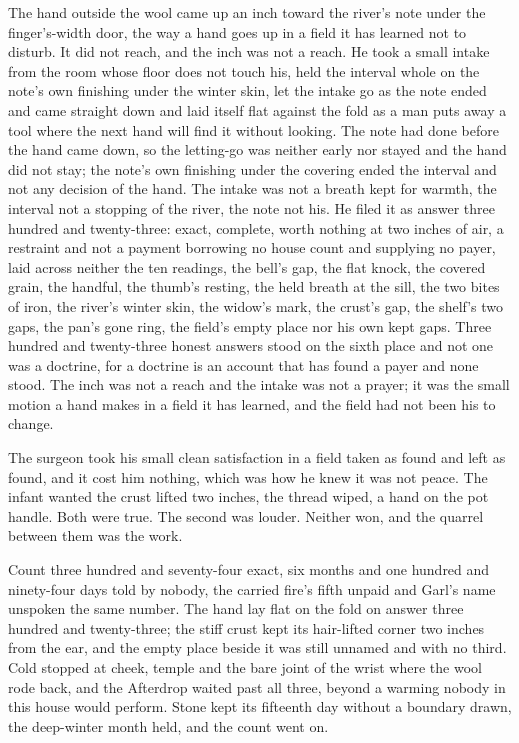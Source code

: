 The hand outside the wool came up an inch toward the river's note under the finger's-width door, the way a hand goes up in a field it has learned not to disturb. It did not reach, and the inch was not a reach. He took a small intake from the room whose floor does not touch his, held the interval whole on the note's own finishing under the winter skin, let the intake go as the note ended and came straight down and laid itself flat against the fold as a man puts away a tool where the next hand will find it without looking. The note had done before the hand came down, so the letting-go was neither early nor stayed and the hand did not stay; the note's own finishing under the covering ended the interval and not any decision of the hand. The intake was not a breath kept for warmth, the interval not a stopping of the river, the note not his. He filed it as answer three hundred and twenty-three: exact, complete, worth nothing at two inches of air, a restraint and not a payment borrowing no house count and supplying no payer, laid across neither the ten readings, the bell's gap, the flat knock, the covered grain, the handful, the thumb's resting, the held breath at the sill, the two bites of iron, the river's winter skin, the widow's mark, the crust's gap, the shelf's two gaps, the pan's gone ring, the field's empty place nor his own kept gaps. Three hundred and twenty-three honest answers stood on the sixth place and not one was a doctrine, for a doctrine is an account that has found a payer and none stood. The inch was not a reach and the intake was not a prayer; it was the small motion a hand makes in a field it has learned, and the field had not been his to change.

The surgeon took his small clean satisfaction in a field taken as found and left as found, and it cost him nothing, which was how he knew it was not peace. The infant wanted the crust lifted two inches, the thread wiped, a hand on the pot handle. Both were true. The second was louder. Neither won, and the quarrel between them was the work.

Count three hundred and seventy-four exact, six months and one hundred and ninety-four days told by nobody, the carried fire's fifth unpaid and Garl's name unspoken the same number. The hand lay flat on the fold on answer three hundred and twenty-three; the stiff crust kept its hair-lifted corner two inches from the ear, and the empty place beside it was still unnamed and with no third. Cold stopped at cheek, temple and the bare joint of the wrist where the wool rode back, and the Afterdrop waited past all three, beyond a warming nobody in this house would perform. Stone kept its fifteenth day without a boundary drawn, the deep-winter month held, and the count went on.
